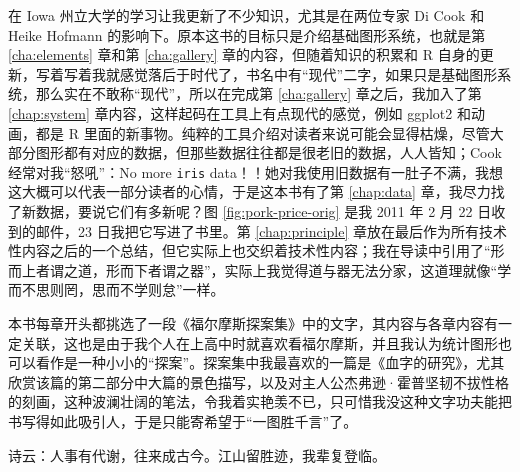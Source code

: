 \documentclass[
  b5paper,
  UTF8,twoside]{book}
\begin{document}
在 Iowa 州立大学的学习让我更新了不少知识，尤其是在两位专家 Di Cook 和 Heike Hofmann 的影响下。原本这书的目标只是介绍基础图形系统，也就是第 \ref{cha:elements} 章和第 \ref{cha:gallery} 章的内容，但随着知识的积累和 R 自身的更新，写着写着我就感觉落后于时代了，书名中有``现代''二字，如果只是基础图形系统，那么实在不敢称``现代''，所以在完成第 \ref{cha:gallery} 章之后，我加入了第 \ref{chap:system} 章内容，这样起码在工具上有点现代的感觉，例如 ggplot2 和动画，都是 R 里面的新事物。纯粹的工具介绍对读者来说可能会显得枯燥，尽管大部分图形都有对应的数据，但那些数据往往都是很老旧的数据，人人皆知；Cook 经常对我``怒吼''：No more \texttt{iris} data！！她对我使用旧数据有一肚子不满，我想这大概可以代表一部分读者的心情，于是这本书有了第 \ref{chap:data} 章，我尽力找了新数据，要说它们有多新呢？图 \ref{fig:pork-price-orig} 是我 2011 年 2 月 22 日收到的邮件，23 日我把它写进了书里。第 \ref{chap:principle} 章放在最后作为所有技术性内容之后的一个总结，但它实际上也交织着技术性内容；我在导读中引用了``形而上者谓之道，形而下者谓之器''，实际上我觉得道与器无法分家，这道理就像``学而不思则罔，思而不学则怠''一样。

本书每章开头都挑选了一段《福尔摩斯探案集》中的文字，其内容与各章内容有一定关联，这也是由于我个人在上高中时就喜欢看福尔摩斯，并且我认为统计图形也可以看作是一种小小的``探案''。探案集中我最喜欢的一篇是《血字的研究》，尤其欣赏该篇的第二部分中大篇的景色描写，以及对主人公杰弗逊·霍普坚韧不拔性格的刻画，这种波澜壮阔的笔法，令我着实艳羡不已，只可惜我没这种文字功夫能把书写得如此吸引人，于是只能寄希望于``一图胜千言''了。

诗云：人事有代谢，往来成古今。江山留胜迹，我辈复登临。

\backmatter
\printindex

  
\end{document}
